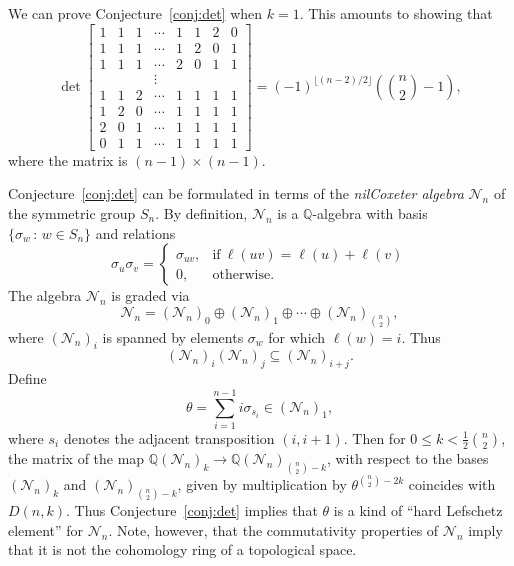 \documentclass[12pt]{amsart}
\theoremstyle{definition}
\theoremstyle{remark}
\numberwithin{equation}{section}
\begin{document}
We can prove Conjecture~\ref{conj:det} when $k=1$. This amounts to
showing that
 \begin{equation} \det\left[ \begin{array}{ccccccccc}
    1 & 1 & 1 & \cdots & 1 & 1 & 2 & 0\\
    1 & 1 & 1 & \cdots & 1 & 2 & 0 & 1\\
    1 & 1 & 1 & \cdots & 2 & 0 & 1 & 1\\
      &   &   & \vdots\\
    1 & 1 & 2 & \cdots & 1 & 1 & 1 & 1\\
    1 & 2 & 0 & \cdots & 1 & 1 & 1 & 1\\
    2 & 0 & 1 & \cdots & 1 & 1 & 1 & 1\\
    0 & 1 & 1 & \cdots & 1 & 1 & 1 & 1
  \end{array} \right] = (-1)^{\lfloor (n-2)/2\rfloor}
     \left(\binom n2-1\right), \label{eq:k1det} \end{equation}
where the matrix is $(n-1)\times (n-1)$.

Conjecture~\ref{conj:det} can be formulated in terms of the
\emph{nilCoxeter algebra} ${\mathcal{N}}_n$ of the symmetric group $S_n$. By
definition, ${\mathcal{N}}_n$ is a ${\mathbb{Q}}$-algebra with basis $\{\sigma_w{\,:\,}
w\in S_n\}$ and relations 
$$ \sigma_u\sigma_v = \left\{ \begin{array}{rl}
  \sigma_{uv}, & \mathrm{if}\ \ell(uv)=\ell(u)+\ell(v)\\[.5em]
   0, & \mathrm{otherwise}. \end{array} \right. $$
The algebra ${\mathcal{N}}_n$ is graded via
 $$ {\mathcal{N}}_n = ({\mathcal{N}}_n)_0\oplus ({\mathcal{N}}_n)_1\oplus\cdots\oplus
   ({\mathcal{N}}_n)_{\binom n2}, $$
where $({\mathcal{N}}_n)_i$ is spanned by elements $\sigma_w$ for which
$\ell(w)=i$. Thus
 $$ ({\mathcal{N}}_n)_i({\mathcal{N}}_n)_j\subseteq ({\mathcal{N}}_n)_{i+j}. $$
Define
  $$ \theta=\sum_{i=1}^{n-1}i\sigma_{s_i}\in ({\mathcal{N}}_n)_1, $$
where $s_i$ denotes the adjacent transposition $(i,i+1)$.
Then for $0\leq k<\frac 12\binom n2$, the matrix of the map
${\mathbb{Q}}({\mathcal{N}}_n)_k\to {\mathbb{Q}}({\mathcal{N}}_n)_{\binom n2-k}$, with respect to the
bases $({\mathcal{N}}_n)_k$ and $({\mathcal{N}}_n)_{\binom n2-k}$, given by
multiplication by $\theta^{\binom n2-2k}$ coincides with
$D(n,k)$. Thus Conjecture~\ref{conj:det} implies that $\theta$ is a
kind of ``hard Lefschetz element'' for ${\mathcal{N}}_n$. Note, however, that
the commutativity properties of ${\mathcal{N}}_n$ imply that it is not the
cohomology ring of a topological space.
\end{document}
